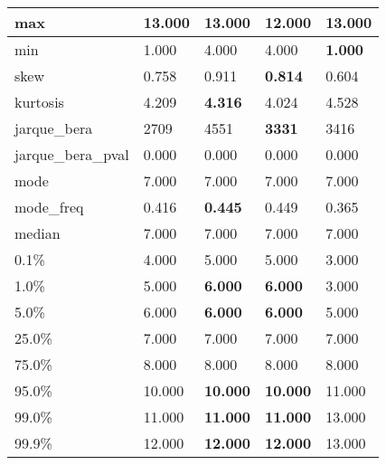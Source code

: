 \begin{table}[H]
\begin{tabular}{|l|m{10em}|m{10em}|m{10em}|m{10em}|}
\hline max & 13.000 & \bfseries 13.000 & \cellcolor[rgb]{0.9, 0.54, 0.52} 12.000 & \bfseries 13.000 \\
\hline min & 1.000 & \cellcolor[rgb]{0.9, 0.54, 0.52} 4.000 & \cellcolor[rgb]{0.9, 0.54, 0.52} 4.000 & \bfseries 1.000 \\
\hline skew & 0.758 & 0.911 & \bfseries 0.814 & \cellcolor[rgb]{0.9, 0.54, 0.52} 0.604 \\
\hline kurtosis & 4.209 & \bfseries 4.316 & 4.024 & \cellcolor[rgb]{0.9, 0.54, 0.52} 4.528 \\
\hline jarque\_bera & 2709 & \cellcolor[rgb]{0.9, 0.54, 0.52} 4551 & \bfseries 3331 & 3416 \\
\hline jarque\_bera\_pval & 0.000 & 0.000 & 0.000 & 0.000 \\
\hline mode & 7.000 & 7.000 & 7.000 & 7.000 \\
\hline mode\_freq & 0.416 & \bfseries 0.445 & 0.449 & \cellcolor[rgb]{0.9, 0.54, 0.52} 0.365 \\
\hline median & 7.000 & 7.000 & 7.000 & 7.000 \\
\hline 0.1\% & 4.000 & 5.000 & 5.000 & 3.000 \\
\hline 1.0\% & 5.000 & \bfseries 6.000 & \bfseries 6.000 & \cellcolor[rgb]{0.9, 0.54, 0.52} 3.000 \\
\hline 5.0\% & 6.000 & \bfseries 6.000 & \bfseries 6.000 & \cellcolor[rgb]{0.9, 0.54, 0.52} 5.000 \\
\hline 25.0\% & 7.000 & 7.000 & 7.000 & 7.000 \\
\hline 75.0\% & 8.000 & 8.000 & 8.000 & 8.000 \\
\hline 95.0\% & 10.000 & \bfseries 10.000 & \bfseries 10.000 & \cellcolor[rgb]{0.9, 0.54, 0.52} 11.000 \\
\hline 99.0\% & 11.000 & \bfseries 11.000 & \bfseries 11.000 & \cellcolor[rgb]{0.9, 0.54, 0.52} 13.000 \\
\hline 99.9\% & 12.000 & \bfseries 12.000 & \bfseries 12.000 & \cellcolor[rgb]{0.9, 0.54, 0.52} 13.000 \\
\hline
\end{tabular}
\end{table}
